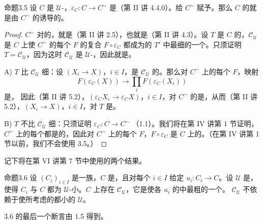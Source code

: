 \begin{SGAresult}{命题}{3.5}
设 $C$ 是 $\mathcal U$-，$\varepsilon_C:C\to C^{\sim}$ 是（第 II 讲 4.4.0）。给 $C^{\sim}$ 赋予。那么 $C$ 的就是由 $C^{\sim}$ 的诱导的。
\end{SGAresult}
\begin{proof}
$C^{\sim}$ 对的，就是（第 II 讲 2.5），也就是（第 II 讲 4.3）。设 $T$ 是 $C$ 的，$\mathscr C_{\mathcal U}$ 是 $C$ 上使 $C^{\sim}$ 的每个 $F$ 的复合 $F\circ\varepsilon_C$ 都成为的 $T'$ 中最细的一个。只须证明 $T=\mathscr C_{\mathcal U}$，因为这时 $\mathscr C_{\mathcal U}$ 是 $\mathcal U$-，因此就是。

A)  $T$ 比 $\mathscr C_{\mathcal U}$ 细：设 $(X_i\to X)$，$i\in I$，是 $\mathscr C_{\mathcal U}$ 的。那么对 $C^{\sim}$ 上的每个 $F$，映射
\[
 F(\varepsilon_C(X))\longrightarrow\prod_i F(\varepsilon_C(X_i))
\]
是，
因此（第 II 讲 5.2），$(\varepsilon_CX_i\to\varepsilon_CX)$，$i\in I$，对 $C^{\sim}$ 的是，从而（第 II 讲 5.2），$(X_i\to X)$，$i\in I$，对 $T$ 是。

B)  $T$ 不比 $\mathscr C_{\mathcal U}$ 细：只须证明 $\varepsilon_C:C\to C^{\sim}$ （1.1）。我们将在第 IV 讲第 1 节证明，$C^{\sim}$ 上的每个都是的，因此对 $C^{\sim}$ 上的每个 $F$，$F\circ\varepsilon_C$ 是 $C$ 上的。（在第 IV 讲第 1 节以前，我们不会使用 3.5。）
\end{proof}

记下将在第 VI 讲第 7 节中使用的两个结果。

\begin{SGAresult}{命题}{3.6}
设 $(C_i)_{i\in I}$ 是一族，$C$ 是，且对每个 $i\in I$ 给定 $u_i:C_i\to C$。设 $\mathcal U$ 是，使得 $C_i$ 与 $C$ 都为 $\mathcal U$-小。$C$ 上存在 $\mathscr C_{\mathcal U}$，它是使各 $u_i$ 的中最粗的一个。 $\mathscr C_{\mathcal U}$ 不依赖于使所考虑的都小的 $\mathcal U$。
\end{SGAresult}
3.6 的最后一个断言由 1.5 得到。

